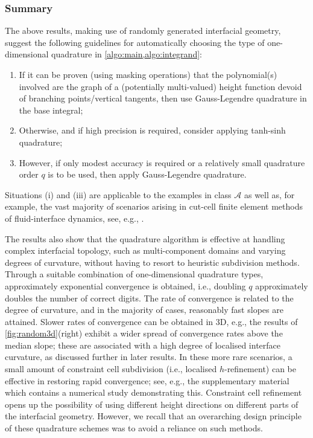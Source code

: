 \documentclass[onefignum,onetabnum,onealgnum,oneeqnum]{siamart190516}
\begin{document}
\subsubsection{Summary}

The above results, making use of randomly generated interfacial geometry, suggest the following guidelines for automatically choosing the type of one-dimensional quadrature in \cref{algo:main,algo:integrand}:
\begin{enumerate}[label=(\roman*),leftmargin=3em]
\item If it can be proven (using masking operations) that the polynomial(s) involved are the graph of a (potentially multi-valued) height function devoid of branching points/vertical tangents, then use Gauss-Legendre quadrature in the base integral; 
\item Otherwise, and if high precision is required, consider applying tanh-sinh quadrature;
\item However, if only modest accuracy is required or a relatively small quadrature order $q$ is to be used, then apply Gauss-Legendre quadrature.  
\end{enumerate}
Situations (i) and (iii) are applicable to the examples in class $\mathcal A$ as well as, for example, the vast majority of scenarios arising in cut-cell finite element methods of fluid-interface dynamics, see, e.g., \cite{InterfacialGauge,ImplicitMeshPartTwo}.

The results also show that the quadrature algorithm is effective at handling complex interfacial topology, such as multi-component domains and varying degrees of curvature, without having to resort to heuristic subdivision methods. Through a suitable combination of one-dimensional quadrature types, approximately exponential convergence is obtained, i.e., doubling $q$ approximately doubles the number of correct digits. The rate of convergence is related to the degree of curvature, and in the majority of cases, reasonably fast slopes are attained. Slower rates of convergence can be obtained in 3D, e.g., the results of \cref{fig:random3d}(right) exhibit a wider spread of convergence rates above the median slope; these are associated with a high degree of localised interface curvature, as discussed further in later results. In these more rare scenarios, a small amount of constraint cell subdivision (i.e., localised $h$-refinement) can be effective in restoring rapid convergence; see, e.g., the supplementary material which contains a numerical study demonstrating this. Constraint cell refinement opens up the possibility of using different height directions on different parts of the interfacial geometry. However, we recall that an overarching design principle of these quadrature schemes was to avoid a reliance on such methods.
\end{document}
